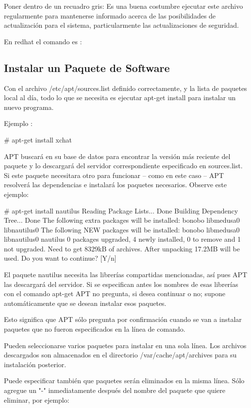 \documentclass[12pt]{article}
\begin{document}
Poner dentro de un recuadro gris:
Es una buena costumbre ejecutar este archivo regularmente para mantenerse informado acerca de las posibilidades de actualización para el sistema, particularmente las actualizaciones de seguridad.

En redhat el comando es :

\subsection*{Instalar un Paquete de Software}

Con el archivo /etc/apt/sources.list definido correctamente, y la lista de paquetes local al día, todo lo
que se necesita es ejecutar apt-get install para instalar un nuevo programa.

Ejemplo :

     # apt-get install xchat

APT buscará en su base de datos para encontrar la versión más reciente del paquete y lo descargará del servidor correspondiente especificado en sources.list. 
Si este paquete necesitara otro para funcionar -- como en este caso -- APT resolverá las dependencias e instalará los paquetes necesarios. Observe este ejemplo:

     # apt-get install nautilus
     Reading Package Lists... Done
     Building Dependency Tree... Done
     The following extra packages will be installed:
       bonobo libmedusa0 libnautilus0
     The following NEW packages will be installed:
       bonobo libmedusa0 libnautilus0 nautilus
     0 packages upgraded, 4 newly installed, 0 to remove and 1 not upgraded.
     Need to get 8329kB of archives. After unpacking 17.2MB will be used.
     Do you want to continue? [Y/n]

El paquete nautilus necesita las librerías compartidas mencionadas, así pues APT las descargará del servidor. Si se especifican antes los nombres de esas librerías con el comando apt-get APT no pregunta, si desea continuar o no; supone automáticamente que se desean instalar esos paquetes.

Esto significa que APT sólo pregunta por confirmación cuando se van a instalar paquetes que no fueron especificados en la línea de comando.

Pueden seleccionarse varios paquetes para instalar en una sola línea. Los archivos descargados son almacenados en el directorio /var/cache/apt/archives para su instalación posterior.

Puede especificar también que paquetes serán eliminados en la misma línea. Sólo agregue un "-" inmediatamente después del nombre del paquete que quiere eliminar, por ejemplo:
\end{document}
